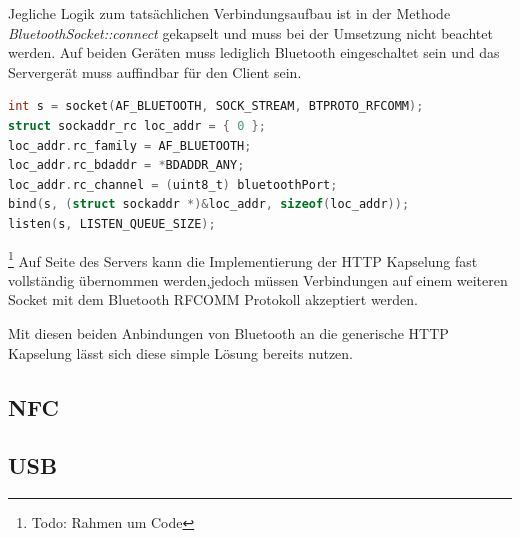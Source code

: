 \documentclass[12pt,a4paper]{article}
\begin{document}
         Jegliche Logik zum tatsächlichen Verbindungsaufbau ist in der Methode {\it BluetoothSocket::connect} gekapselt und muss bei der Umsetzung nicht beachtet werden. Auf beiden Geräten muss lediglich Bluetooth eingeschaltet sein und das Servergerät muss auffindbar für den Client sein.
   
        \begin{lstlisting}[language=C, caption=Verbindungsaufbau mit Bluetooth (Server: C)]
int s = socket(AF_BLUETOOTH, SOCK_STREAM, BTPROTO_RFCOMM);
struct sockaddr_rc loc_addr = { 0 };
loc_addr.rc_family = AF_BLUETOOTH;
loc_addr.rc_bdaddr = *BDADDR_ANY;
loc_addr.rc_channel = (uint8_t) bluetoothPort;
bind(s, (struct sockaddr *)&loc_addr, sizeof(loc_addr));
listen(s, LISTEN_QUEUE_SIZE);
        \end{lstlisting}\footnote{Todo: Rahmen um Code}
        Auf Seite des Servers kann die Implementierung der HTTP Kapselung fast vollständig übernommen werden,jedoch müssen Verbindungen auf einem weiteren Socket mit dem Bluetooth RFCOMM Protokoll akzeptiert werden.
        
        Mit diesen beiden Anbindungen von Bluetooth an die generische HTTP Kapselung lässt sich diese simple Lösung bereits nutzen.
        
        \subsection{NFC}
		
		\subsection{USB}
		
\end{document}
